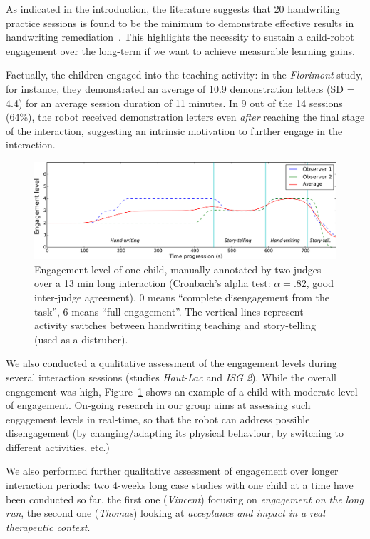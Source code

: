 \documentclass{article}
\begin{document}
As indicated in the introduction, the literature suggests that 20 handwriting
practice sessions is found to be the minimum to demonstrate effective results in
handwriting remediation~\cite{Hoy2011}. This highlights the necessity to sustain
a child-robot engagement over the long-term if we want to achieve measurable learning gains.

Factually, the children engaged into the teaching activity: in the
\textit{Florimont} study, for instance, they demonstrated an average of
10.9 demonstration letters (SD = 4.4) for an average session duration of 11 minutes.
In 9 out of the 14 sessions (64\%), the robot
received demonstration letters even \emph{after} reaching the final stage of the
interaction, suggesting an intrinsic motivation to further engage in the
interaction.

\begin{figure}[ht!]
    \centering
    \includegraphics[width=0.9\linewidth]{engagement}
    \caption{\small Engagement level of one child, manually annotated by two judges
        over a 13 min long interaction (Cronbach’s alpha test: $\alpha = .82$,
        good inter-judge agreement). 0 means ``complete disengagement from the
        task'', 6 means ``full engagement''. The vertical lines represent activity
    switches between handwriting teaching and story-telling (used as a
    distruber).}
    \label{engagement_level}
\end{figure}

We also conducted a qualitative assessment of the engagement levels during
several interaction sessions (studies \textit{Haut-Lac} and \textit{ISG 2}).
While the overall engagement was high, Figure~\ref{engagement_level} shows an
example of a child with moderate level of engagement. On-going research in our
group aims at assessing such engagement levels in real-time, so that the robot
can address possible disengagement (by changing/adapting its physical behaviour,
by switching to different activities, etc.)

We also performed further qualitative assessment of engagement over longer
interaction periods: two 4-weeks long case studies with one child at a time have
been conducted so far, the first one (\emph{Vincent}) focusing on
\emph{engagement on the long run}, the second one (\emph{Thomas}) looking at
\emph{acceptance and impact in a real therapeutic context}.
\end{document}
